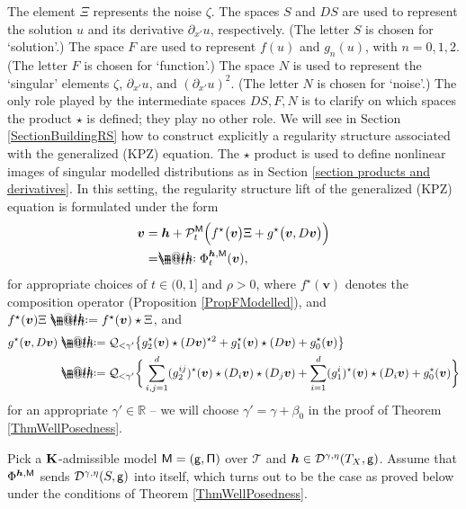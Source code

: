 \documentclass[10pt, reqno]{amsart}
\makeatletter
\numberwithin{subsection}{section}
\numberwithin{subsubsection}{subsection}
\numberwithin{equation}{section} %
\theoremstyle{mystyle}
\theoremstyle{mystyle2}
\theoremstyle{mystyle3}
\newcommand{\bsh}{\boldsymbol{h}}
\newcommand{\bsv}{\boldsymbol{v}}
\newcommand\bbR{\mathbb{R}}
\newcommand{\mcD}{\mathcal{D}}
\newcommand{\mcP}{\mathcal{P}}
\newcommand{\mcQ}{\mathcal{Q}}
\newcommand*{\defeq}{\mathrel{\rlap{%
                     \raisebox{0.3ex}{$\m@th\cdot$}}%
                     \raisebox{-0.3ex}{$\m@th\cdot$}}%
                     =}
\newcommand*{\eqdef}{=\mathrel{\rlap{%
                     \raisebox{0.3ex}{$\m@th\cdot$}}%
                     \raisebox{-0.3ex}{$\m@th\cdot$}}%
                     }
\makeatother
\begin{document}
The element $\Xi$ represents the noise $\zeta$. The spaces $S$ and $DS$ are used to represent the solution $u$ and its derivative $\partial_{x'}u$, respectively. (The letter $S$ is chosen for `solution'.) The space $F$ are used to represent $f(u)$ and $g_n(u)$, with $n=0,1,2$. (The 
letter $F$ is chosen for `function'.) The space $N$ is used to represent the `singular' elements $\zeta$, $\partial_{x'}u$, and $(\partial_{x'}u)^2$. (The letter $N$ is chosen for `noise'.) The only role played by the intermediate spaces $DS,F, N$ is to clarify on which spaces the product $\star$ is defined; they play no other role. We will see in Section \ref{SectionBuildingRS} how to construct explicitly a regularity structure associated with the generalized (KPZ) equation. The $\star$ product is used to define nonlinear images of singular modelled distributions as in Section \ref{section products and derivatives}. In this setting, the regularity structure lift of the generalized (KPZ) equation is formulated under the form 
\begin{equation}   \label{EqPDERSPrime} \begin{split}
\bsv &= \bsh+\mcP_t^{\sf M}\Big(f^\star\big(\bsv\big) \Xi + g^\star\big(\bsv, D\bsv \big)\Big)  \\
       &\eqdef \Phi_t^{\bsh,{\sf M}}(\bsv),
\end{split} \end{equation}   
for appropriate choices of $t\in(0,1]$ and $\rho>0$, where $f^\star(\bsv)$ denotes the composition operator (Proposition \ref{PropFModelled}), and $f^\star(\bsv)\Xi\defeq f^\star(\bsv)\star\Xi$, and
\begin{align*}
g^\star(\bsv,D\bsv)
&\defeq\mcQ_{<\gamma'}\big\{g_2^\star(\bsv)\star(D\bsv)^{\star2}+g_1^\star(\bsv)\star (D\bsv)+g_0^\star(\bsv)\big\}\\
&\defeq\mcQ_{<\gamma'}\bigg\{\sum_{i,j=1}^d(g_2^{ij})^\star(\bsv)\star(D_i\bsv)\star(D_j\bsv)+\sum_{i=1}^d(g_1^i)^\star(\bsv)\star (D_i\bsv)+g_0^\star(\bsv)\bigg\}
\end{align*}
for an appropriate $\gamma'\in\bbR$ -- we will choose $\gamma'=\gamma+\beta_0$ in the proof of Theorem \ref{ThmWellPosedness}.

\medskip

Pick a $\bf K$-admissible model $\sf M=(g,\Pi)$ over $\mathscr{T}$ and $\bsh\in\mcD^{\gamma,\eta}(T_X,\sf g)$. Assume that $\Phi^{\bsh,{\sf M}}$ sends $\mcD^{\gamma,\eta}(S,\sf g)$ into itself, which turns out to be the 
case as proved below under the conditions of Theorem \ref{ThmWellPosedness}.
\end{document}

